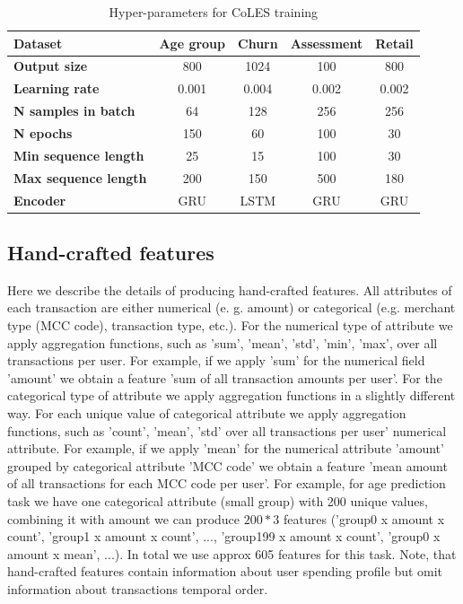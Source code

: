 \documentclass[sigconf, anonymous]{acmart}
\begin{document}
\begin{table}
\centering
\caption{Hyper-parameters for CoLES training}
\begin{tabularx}{\linewidth}{Xcccc}
\toprule
\textbf{Dataset} & \textbf{Age group} & \textbf{Churn} & \textbf{Assessment} & \textbf{Retail} \\
\midrule
\textbf{Output size} & 800 & 1024 & 100 & 800 \\
\textbf{Learning rate} & 0.001 & 0.004 & 0.002 & 0.002 \\
\textbf{N samples in batch} & 64 & 128 & 256 & 256 \\
\textbf{N epochs} & 150 & 60 & 100 & 30 \\
\textbf{Min sequence length} & 25 & 15 & 100 & 30 \\
\textbf{Max sequence length} & 200 & 150 & 500 & 180 \\
\textbf{Encoder} & GRU & LSTM & GRU & GRU \\
\bottomrule
\end{tabularx}
\label{tab-hyper}
\end{table}

\subsection{Hand-crafted features} \label{app-sec-hand}

Here we describe the details of producing hand-crafted features. All attributes of each transaction are either numerical (e. g. amount) or categorical (e.g. merchant type (MCC code), transaction type, etc.). 
For the numerical type of attribute we apply aggregation functions, such as 'sum', 'mean', 'std', 'min', 'max', over all transactions per user. For example, if we apply 'sum' for the numerical field 'amount' we obtain a feature 'sum of all transaction amounts per user'. 
For the categorical type of attribute we apply aggregation functions in a slightly different way. For each unique value of categorical attribute we apply aggregation functions, such as 'count', 'mean', 'std' over all transactions per user' numerical attribute. For example, if we apply 'mean' for the numerical attribute 'amount' grouped by categorical attribute 'MCC code' we obtain a feature 'mean amount of all transactions for each MCC code per user'. 
For example, for age prediction task we have one categorical attribute (small group) with 200 unique values, combining it with amount we can produce $200 * 3$ features ('group0 x amount x count',  'group1 x amount x count', ..., 'group199 x amount x count', 'group0 x amount x mean', ...). In total we use approx 605 features for this task. %
Note, that hand-crafted features contain information about user spending profile but omit information about transactions temporal order.
\end{document}
